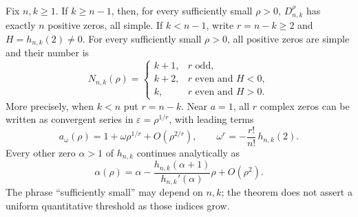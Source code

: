 \begin{theorem}
\label{thm:small-rho}
Fix $n,k\ge1$. If $k\ge n-1$, then, for every sufficiently small
$\rho>0$, $D_{n,k}^{\rho}$ has exactly $n$ positive zeros, all simple.
If $k<n-1$, write $r=n-k\ge2$ and $H=h_{n,k}(2)\ne0$. For every
sufficiently small $\rho>0$, all positive zeros are simple and their
number is
\begin{equation}\label{eq:small-count}
 N_{n,k}(\rho)=
 \begin{cases}
 k+1,&r\text{ odd},\\
 k+2,&r\text{ even and }H<0,\\
 k,&r\text{ even and }H>0.
 \end{cases}
\end{equation}
More precisely, when $k<n$ put $r=n-k$. Near $a=1$, all $r$ complex zeros can be written as
convergent series in $\varepsilon=\rho^{1/r}$, with leading terms
\begin{equation}\label{eq:puiseux}
 a_\omega(\rho)=1+\omega\rho^{1/r}+O(\rho^{2/r}),\qquad
 \omega^r=-\frac{r!}{n!}\,h_{n,k}(2).
\end{equation}
Every other zero $\alpha>1$ of $h_{n,k}$ continues analytically as
\begin{equation}\label{eq:simple-zero-shift}
 \alpha(\rho)=\alpha-
 \frac{h_{n,k}(\alpha+1)}{h_{n,k}'(\alpha)}\rho+O(\rho^2).
\end{equation}
The phrase ``sufficiently small'' may depend on $n,k$; the theorem does
not assert a uniform quantitative threshold as those indices grow.
\end{theorem}
